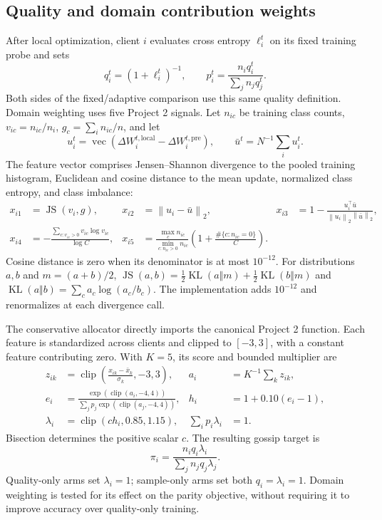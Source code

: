 \documentclass[11pt]{article}
\newcommand{\dW}{\Delta W}
\newcommand{\norm}[1]{\left\lVert#1\right\rVert}
\newcommand{\clip}{\operatorname{clip}}
\begin{document}
\subsection{Quality and domain contribution weights}
After local optimization, client $i$ evaluates cross entropy $\ell_i^t$ on its fixed training probe and sets
\begin{equation}
 q_i^t=(1+\ell_i^t)^{-1},\qquad
 p_i^t=\frac{n_iq_i^t}{\sum_jn_jq_j^t}.
\end{equation}
Both sides of the fixed/adaptive comparison use this same quality definition. Domain weighting uses five Project 2 signals. Let $n_{ic}$ be training class counts, $v_{ic}=n_{ic}/n_i$, $g_c=\sum_i n_{ic}/n$, and let
\begin{equation}
 u_i^t=\operatorname{vec}(\dW_i^{t,\mathrm{local}}-\dW_i^{t,\mathrm{pre}}),\qquad
 \bar u^t=N^{-1}\sum_i u_i^t.
\end{equation}
The feature vector comprises Jensen--Shannon divergence to the pooled training histogram, Euclidean and cosine distance to the mean update, normalized class entropy, and class imbalance:
\begin{align}
 x_{i1}&=\operatorname{JS}(v_i,g),&
 x_{i2}&=\norm{u_i-\bar u}_2,&
 x_{i3}&=1-\frac{u_i^\top\bar u}{\norm{u_i}_2\norm{\bar u}_2},\nonumber\\
 x_{i4}&=-\frac{\sum_{c:v_{ic}>0}v_{ic}\log v_{ic}}{\log C},&
 x_{i5}&=\frac{\max_c n_{ic}}{\min_{c:n_{ic}>0}n_{ic}}
 \left(1+\frac{\#\{c:n_{ic}=0\}}{C}\right).
 \label{eq:domain-features}
\end{align}
Cosine distance is zero when its denominator is at most $10^{-12}$. For distributions $a,b$ and $m=(a+b)/2$, $\operatorname{JS}(a,b)=\tfrac12\operatorname{KL}(a\Vert m)+\tfrac12\operatorname{KL}(b\Vert m)$ and $\operatorname{KL}(a\Vert b)=\sum_c a_c\log(a_c/b_c)$. The implementation adds $10^{-12}$ and renormalizes at each divergence call.

The conservative allocator directly imports the canonical Project 2 function. Each feature is standardized across clients and clipped to $[-3,3]$, with a constant feature contributing zero. With $K=5$, its score and bounded multiplier are
\begin{align}
 z_{ik}&=\clip\left(\frac{x_{ik}-\bar x_k}{\sigma_k},-3,3\right),
 &a_i&=K^{-1}\sum_kz_{ik},\nonumber\\
 e_i&=\frac{\exp(\clip(a_i,-4,4))}{\sum_jp_j\exp(\clip(a_j,-4,4))},
 &h_i&=1+0.10(e_i-1),\\
 \lambda_i&=\clip(ch_i,0.85,1.15),
 &\sum_ip_i\lambda_i&=1.
 \label{eq:domain-factors}
\end{align}
Bisection determines the positive scalar $c$. The resulting gossip target is
\begin{equation}
 \pi_i=\frac{n_iq_i\lambda_i}{\sum_jn_jq_j\lambda_j}.
 \label{eq:stationary-weights}
\end{equation}
Quality-only arms set $\lambda_i=1$; sample-only arms set both $q_i=\lambda_i=1$. Domain weighting is tested for its effect on the parity objective, without requiring it to improve accuracy over quality-only training.
\end{document}
